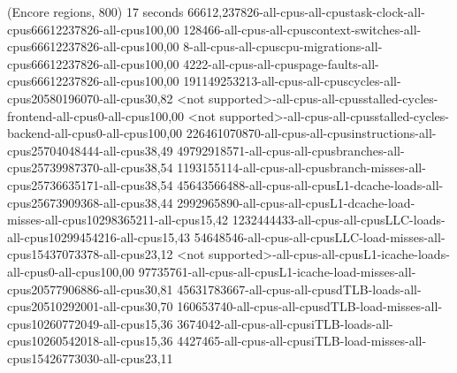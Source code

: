 (Encore regions, 800)
17 seconds
66612,237826-all-cpus-all-cpustask-clock-all-cpus66612237826-all-cpus100,00
128466-all-cpus-all-cpuscontext-switches-all-cpus66612237826-all-cpus100,00
8-all-cpus-all-cpuscpu-migrations-all-cpus66612237826-all-cpus100,00
4222-all-cpus-all-cpuspage-faults-all-cpus66612237826-all-cpus100,00
191149253213-all-cpus-all-cpuscycles-all-cpus20580196070-all-cpus30,82
<not supported>-all-cpus-all-cpusstalled-cycles-frontend-all-cpus0-all-cpus100,00
<not supported>-all-cpus-all-cpusstalled-cycles-backend-all-cpus0-all-cpus100,00
226461070870-all-cpus-all-cpusinstructions-all-cpus25704048444-all-cpus38,49
49792918571-all-cpus-all-cpusbranches-all-cpus25739987370-all-cpus38,54
1193155114-all-cpus-all-cpusbranch-misses-all-cpus25736635171-all-cpus38,54
45643566488-all-cpus-all-cpusL1-dcache-loads-all-cpus25673909368-all-cpus38,44
2992965890-all-cpus-all-cpusL1-dcache-load-misses-all-cpus10298365211-all-cpus15,42
1232444433-all-cpus-all-cpusLLC-loads-all-cpus10299454216-all-cpus15,43
54648546-all-cpus-all-cpusLLC-load-misses-all-cpus15437073378-all-cpus23,12
<not supported>-all-cpus-all-cpusL1-icache-loads-all-cpus0-all-cpus100,00
97735761-all-cpus-all-cpusL1-icache-load-misses-all-cpus20577906886-all-cpus30,81
45631783667-all-cpus-all-cpusdTLB-loads-all-cpus20510292001-all-cpus30,70
160653740-all-cpus-all-cpusdTLB-load-misses-all-cpus10260772049-all-cpus15,36
3674042-all-cpus-all-cpusiTLB-loads-all-cpus10260542018-all-cpus15,36
4427465-all-cpus-all-cpusiTLB-load-misses-all-cpus15426773030-all-cpus23,11
